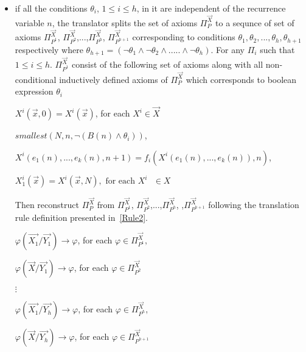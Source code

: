 \begin{itemize}
	\item if all the conditions $\theta_i$, $1\leq i\leq h$,
	in it are independent of the recurrence variable $n$, the translator splits the set of axioms $\Pi_P^{\vec{X}}$ to a sequnce of set of axioms $\Pi_{P^{1}}^{\vec{X}}$, $\Pi_{P^{2}}^{\vec{X}}$,...,$\Pi_{P^{h}}^{\vec{X}}$, $\Pi_{P^{h+1}}^{\vec{X}}$ corresponding to conditions $\theta_1, \theta_2,...,\theta_h, \theta_{h+1}$ respectively where $\theta_{h+1}   = (\neg \theta_1 \land \neg \theta_2 \land..... \land \neg \theta_h)$.
	For any $\Pi_i$ such that $1\leq i\leq h$. $\Pi_{P^{1}}^{\vec{X}}$ consist of the following set of axioms along with all non-conditional inductively defined axioms of $\Pi_P^{\vec{X}}$  which corresponds to boolean expression $\theta_i$
	
    \vspace{2mm}
	$X^i(\vec{x},0) = X^i(\vec{x})$,  for each $X^i \in  \vec{X}$

	\vspace{2mm}
	
	$smallest(N, n, \neg (B(n) \land \theta_i))$, 
	
	\vspace{2mm}
	$X^i(e_1(n), ..., e_k(n),n+1) = f_i(X^i(e_1(n), ...,e_k(n)),n)$,

	\vspace{2mm} 
	$X^i_1(\vec{x}) = X^i(\vec{x}, N), \text{ for each $X^i$ $\in X$ }$

	\vspace{2mm}

     Then reconstruct $\Pi_P^{\vec{X}}$ from $\Pi_{P^{1}}^{\vec{X}}$, $\Pi_{P^{2}}^{\vec{X}}$,...,$\Pi_{P^{h}}^{\vec{X}}$, ,$\Pi_{P^{h+1}}^{\vec{X}}$ following the translation rule definition presented in~\ref{Rule2}.
     
	\vspace{2mm}
	$\varphi(\vec{X_1}/\vec{Y_1}) \rightarrow \varphi$, for each $\varphi \in \Pi_{P^{1}}^{\vec{X}},$

	\vspace{2mm}
	$\varphi(\vec{X}/\vec{Y_1}) \rightarrow \varphi$, for each $\varphi \in \Pi_{P^{2}}^{\vec{X}}$
	\vspace{2mm}
	
    $\vdots$
    
	\vspace{2mm}
	$\varphi(\vec{X_1}/\vec{Y_h}) \rightarrow \varphi$, for each $\varphi \in \Pi_{P^{h}}^{\vec{X}},$

	\vspace{2mm}
	$\varphi(\vec{X}/\vec{Y_h}) \rightarrow \varphi$, for each $\varphi \in \Pi_{P^{h+1}}^{\vec{X}}$
	\vspace{2mm}
	

\end{itemize}
